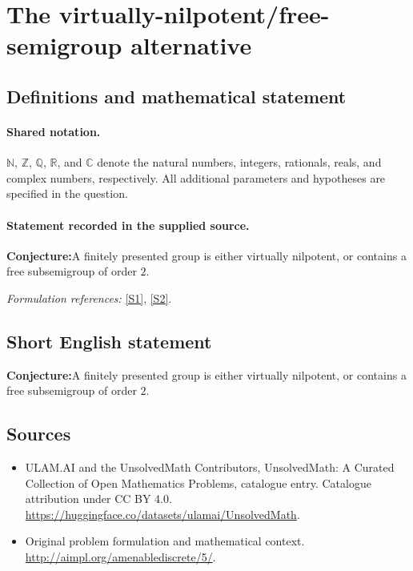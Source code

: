 \documentclass[11pt]{article}
\newcommand{\sref}[2]{\hyperlink{source:#1:#2}{[S#2]}}
\begin{document}
\section{The virtually-nilpotent/free-semigroup alternative}\label{statement}

\subsection{Definitions and mathematical statement}

\paragraph{Shared notation.}$\mathbb N$, $\mathbb Z$, $\mathbb Q$, $\mathbb R$, and $\mathbb C$ denote the natural numbers, integers, rationals, reals, and complex numbers, respectively. All additional parameters and hypotheses are specified in the question.


\paragraph{Statement recorded in the supplied source.}
\textbf{Conjecture:}A finitely presented group is either virtually nilpotent, or contains a free subsemigroup of order $2$.
\par\smallskip\textit{Formulation references:} \sref{statement}{1}, \sref{statement}{2}.
\subsection{Short English statement}
\textbf{Conjecture:}A finitely presented group is either virtually nilpotent, or contains a free subsemigroup of order $2$.
\subsection{Sources}
\begin{itemize}
\item[\hypertarget{source:statement:1}{S1}] ULAM.AI and the UnsolvedMath Contributors, UnsolvedMath: A Curated Collection of Open Mathematics Problems, catalogue entry. Catalogue attribution under CC BY 4.0.
\url{https://huggingface.co/datasets/ulamai/UnsolvedMath}.
\item[\hypertarget{source:statement:2}{S2}] Original problem formulation and mathematical context.
\url{http://aimpl.org/amenablediscrete/5/}.
\end{itemize}
\label{end:statement}
\end{document}
